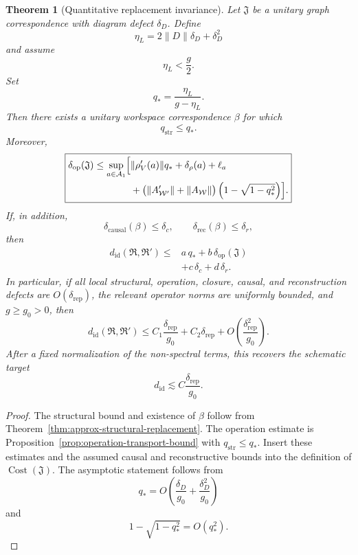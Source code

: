 \documentclass[11pt,letterpaper]{article}
\theoremstyle{plain}
\newtheorem{theorem}{Theorem}
\theoremstyle{definition}
\begin{document}
\begin{theorem}[Quantitative replacement invariance]\label{thm:replacement-invariance}
Let \(\mathfrak J\) be a unitary graph correspondence with diagram defect
\(\delta_D\). Define
\[
\eta_L=2\|D\|\delta_D+\delta_D^2
\]
and assume
\[
\eta_L<\frac g2.
\]
Set
\[
q_*
=
\frac{\eta_L}{g-\eta_L}.
\]
Then there exists a unitary workspace correspondence \(\beta\) for which
\[
q_{\mathrm{str}}\leq q_*.
\]
Moreover,
\[
\boxed{
\begin{aligned}
\delta_{\mathrm{op}}(\mathfrak J)
\leq
\sup_{a\in\mathcal A_1}
\Bigl[&
\|\rho_V'(a)\|q_*
+\delta_\rho(a)
+\ell_a\\
&+
\bigl(\|A_{\mathcal W'}'\|+\|A_{\mathcal W}\|\bigr)
\left(1-\sqrt{1-q_*^2}\right)
\Bigr].
\end{aligned}
}
\]
If, in addition,
\[
\delta_{\mathrm{causal}}(\beta)\leq\delta_c,
\qquad
\delta_{\mathrm{rec}}(\beta)\leq\delta_r,
\]
then
\[
\boxed{
\begin{aligned}
d_{\mathrm{id}}(\mathfrak R,\mathfrak R')
\leq
&a\,q_*+b\,\delta_{\mathrm{op}}(\mathfrak J)\\
&+c\,\delta_c+d\,\delta_r.
\end{aligned}
}
\]
In particular, if all local structural, operation, closure, causal, and
reconstruction defects are \(O(\delta_{\mathrm{rep}})\), the relevant
operator norms are uniformly bounded, and \(g\geq g_0>0\), then
\[
\boxed{
d_{\mathrm{id}}(\mathfrak R,\mathfrak R')
\leq
C_1\frac{\delta_{\mathrm{rep}}}{g_0}
+C_2\delta_{\mathrm{rep}}
+O\!\left(\frac{\delta_{\mathrm{rep}}^2}{g_0}\right).
}
\]
After a fixed normalization of the non-spectral terms, this recovers the
schematic target
\[
d_{\mathrm{id}}
\lesssim
C\frac{\delta_{\mathrm{rep}}}{g_0}.
\]
\end{theorem}

\begin{proof}
The structural bound and existence of \(\beta\) follow from
Theorem~\ref{thm:approx-structural-replacement}. The operation estimate is
Proposition~\ref{prop:operation-transport-bound} with
\(q_{\mathrm{str}}\leq q_*\). Insert these estimates and the assumed causal
and reconstructive bounds into the definition of
\(\operatorname{Cost}(\mathfrak J)\). The asymptotic statement follows from
\[
q_*=O\!\left(\frac{\delta_D}{g_0}
+\frac{\delta_D^2}{g_0}\right)
\]
and
\[
1-\sqrt{1-q_*^2}=O(q_*^2).
\]
\end{proof}
\end{document}
